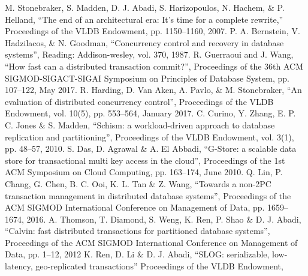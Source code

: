 

\newpage


\begin{thebibliography}{00}
  M. Stonebraker, S. Madden, D. J. Abadi,  S. Harizopoulos, N. Hachem, \& P. Helland,
  ``The end of an architectural era: It's time for a complete rewrite,''
  Proceedings of the VLDB Endowment,
  pp. 1150--1160,
  2007.
  P. A. Bernstein, V. Hadzilacos, \& N. Goodman,
  ``Concurrency control and recovery in database systems'',
  Reading: Addison-wesley,
  vol. 370,
  1987.
  R. Guerraoui and J. Wang,
  ``How fast can a distributed transaction commit?'',
  Proceedings of the 36th ACM SIGMOD-SIGACT-SIGAI Symposium on Principles of
  Database System,
  pp. 107--122,
  May 2017.
  R. Harding, D. Van Aken, A. Pavlo, \& M. Stonebraker,
  ``An evaluation of distributed concurrency control'',
  Proceedings of the VLDB Endowment,
  vol. 10(5),
  pp. 553--564,
  January 2017.
  C. Curino, Y. Zhang, E. P. C. Jones \& S. Madden,
  ``Schism: a workload-driven approach to database replication and partitioning'',
  Proceedings of the VLDB Endowment,
  vol. 3(1),
  pp. 48--57,
  2010.
  S. Das, D. Agrawal \& A. El Abbadi,
  ``G-Store: a scalable data store for transactional multi key access in the cloud'',
  Proceedings of the 1st {ACM} Symposium on Cloud Computing,
  pp. 163--174,
  June 2010.
  Q. Lin, P. Chang, G. Chen, B. C. Ooi,  K. L. Tan \& Z. Wang,
  ``Towards a non-2PC transaction management in distributed database systems'',
  Proceedings of the {ACM} {SIGMOD} International Conference on Management of
  Data,
  pp. 1659--1674,
  2016.
  A. Thomson, T. Diamond, S. Weng, K. Ren, P. Shao \& D. J. Abadi,
  ``Calvin: fast distributed transactions for partitioned database systems'',
  Proceedings of the {ACM} {SIGMOD} International Conference on Management of
  Data,
  pp. 1--12,
  2012
  K. Ren, D. Li \& D. J. Abadi,
  ``SLOG: serializable, low-latency, geo-replicated transactions''
  Proceedings of the VLDB Endowment,

\end{thebibliography}
